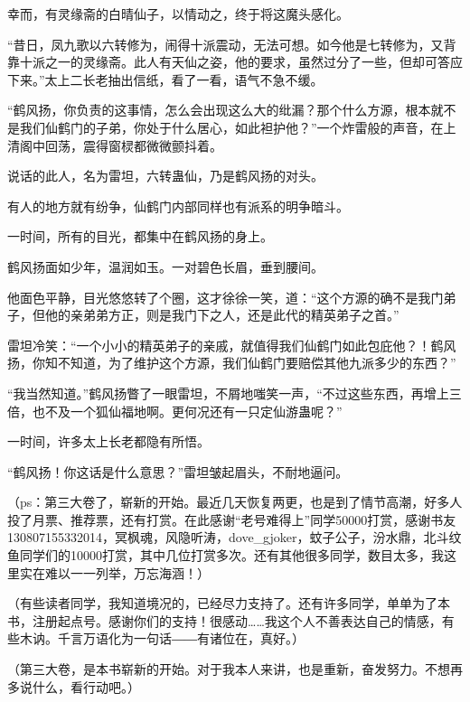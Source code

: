 \begin{this_body}
幸而，有灵缘斋的白晴仙子，以情动之，终于将这魔头感化。

“昔日，凤九歌以六转修为，闹得十派震动，无法可想。如今他是七转修为，又背靠十派之一的灵缘斋。此人有天仙之姿，他的要求，虽然过分了一些，但却可答应下来。”太上二长老抽出信纸，看了一看，语气不急不缓。

“鹤风扬，你负责的这事情，怎么会出现这么大的纰漏？那个什么方源，根本就不是我们仙鹤门的子弟，你处于什么居心，如此袒护他？”一个炸雷般的声音，在上清阁中回荡，震得窗棂都微微颤抖着。

说话的此人，名为雷坦，六转蛊仙，乃是鹤风扬的对头。

有人的地方就有纷争，仙鹤门内部同样也有派系的明争暗斗。

一时间，所有的目光，都集中在鹤风扬的身上。

鹤风扬面如少年，温润如玉。一对碧色长眉，垂到腰间。

他面色平静，目光悠悠转了个圈，这才徐徐一笑，道：“这个方源的确不是我门弟子，但他的亲弟弟方正，则是我门下之人，还是此代的精英弟子之首。”

雷坦冷笑：“一个小小的精英弟子的亲戚，就值得我们仙鹤门如此包庇他？！鹤风扬，你知不知道，为了维护这个方源，我们仙鹤门要赔偿其他九派多少的东西？”

“我当然知道。”鹤风扬瞥了一眼雷坦，不屑地嗤笑一声，“不过这些东西，再增上三倍，也不及一个狐仙福地啊。更何况还有一只定仙游蛊呢？”

一时间，许多太上长老都隐有所悟。

“鹤风扬！你这话是什么意思？”雷坦皱起眉头，不耐地逼问。

（ps：第三大卷了，崭新的开始。最近几天恢复两更，也是到了情节高潮，好多人投了月票、推荐票，还有打赏。在此感谢“老号难得上”同学50000打赏，感谢书友130807155332014，冥枫魂，风隐听涛，dove\_gjoker，蚊子公子，汾水鼎，北斗纹鱼同学们的10000打赏，其中几位打赏多次。还有其他很多同学，数目太多，我这里实在难以一一列举，万忘海涵！）

（有些读者同学，我知道境况的，已经尽力支持了。还有许多同学，单单为了本书，注册起点号。感谢你们的支持！很感动……我这个人不善表达自己的情感，有些木讷。千言万语化为一句话――有诸位在，真好。）

（第三大卷，是本书崭新的开始。对于我本人来讲，也是重新，奋发努力。不想再多说什么，看行动吧。）

\end{this_body}


